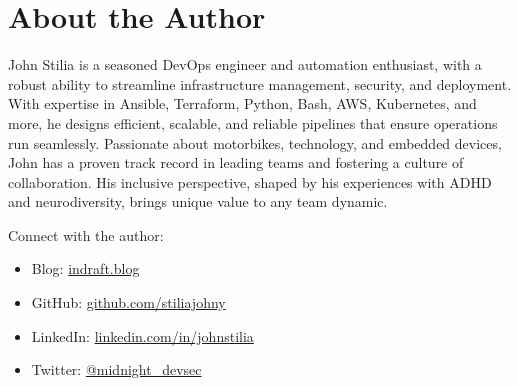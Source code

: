 \chapter*{About the Author}


\noindent John Stilia is a seasoned DevOps engineer and automation enthusiast, with a robust ability to streamline infrastructure management, security, and deployment. With expertise in Ansible, Terraform, Python, Bash, AWS, Kubernetes, and more, he designs efficient, scalable, and reliable pipelines that ensure operations run seamlessly. Passionate about motorbikes, technology, and embedded devices, John has a proven track record in leading teams and fostering a culture of collaboration. His inclusive perspective, shaped by his experiences with ADHD and neurodiversity, brings unique value to any team dynamic.


\vspace{1cm}
\noindent Connect with the author:
{\sloppy\raggedright
\begin{itemize}
    \item Blog: \url{indraft.blog}
    \item GitHub: \url{github.com/stiliajohny}
    \item LinkedIn: \url{linkedin.com/in/johnstilia}
    \item Twitter: \url{@midnight\_devsec}
\end{itemize}
}